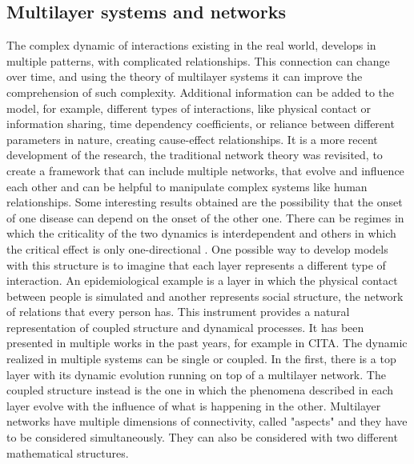 \subsection{Multilayer systems and networks} 

The complex dynamic of interactions existing in the real world, develops in multiple patterns, with complicated relationships. This connection can change over time, and using the theory of multilayer systems it can improve the comprehension of such complexity. Additional information can be added to the model, for example, different types of interactions, like physical contact or information sharing, time dependency coefficients, or reliance between different parameters in nature, creating cause-effect relationships. 
It is a more recent development of the research, the traditional network theory was revisited, to create a framework that can include multiple networks, that evolve and influence each other \cite{DeDomenico2016} and can be helpful to manipulate complex systems like human relationships. Some interesting results obtained are the possibility that the onset of one disease can depend on the onset of the other one. There can be regimes in which the criticality of the two dynamics is interdependent and others in which the critical effect is only one-directional \cite{DeDomenico2016}. 
One possible way to develop models with this structure is to imagine that each layer represents a different type of interaction. An epidemiological example is a layer in which the physical contact between people is simulated and another represents social structure, the network of relations that every person has. This instrument provides a natural representation of coupled structure and dynamical processes. It has been presented in multiple works in the past years, for example in CITA. 
The dynamic realized in multiple systems can be single or coupled. In the first, there is a top layer with its dynamic evolution running on top of a multilayer network. The coupled structure instead is the one in which the phenomena described in each layer evolve with the influence of what is happening in the other. 
Multilayer networks have multiple dimensions of connectivity, called "aspects" and they have to be considered simultaneously. 
They can also be considered with two different mathematical structures. 

